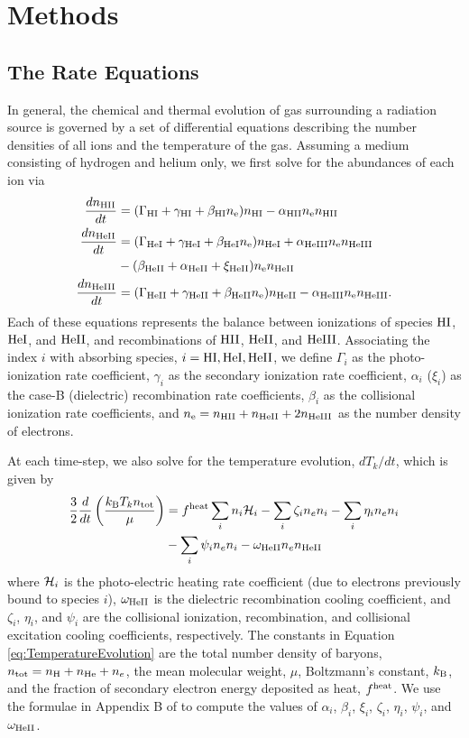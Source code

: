 \documentclass[letterpaper,titlepage,12pt]{article}
\numberwithin{equation}{section}
\begin{document}
\section{Methods}
\subsection{The Rate Equations}
In general, the chemical and thermal evolution of gas surrounding a radiation
source is governed by a set of differential equations describing the number
densities of all ions and the temperature of the gas. Assuming a medium
consisting of hydrogen and helium only, we first solve for the abundances of
each ion via
\begin{align}
    \frac{d n_{\text{HII}}}{dt} & = (\Gamma_{\text{HI}} + \gamma_{\text{HI}} + \beta_{\text{HI}} n_{\text{e}}) n_{\text{HI}} - \alpha_{\text{HII}} n_{\text{e}} n_{\text{HII}}   \label{eq:HIIRateEquation} \\ 
    \frac{d n_{\text{HeII}}}{dt} & = (\Gamma_{\text{HeI}} + \gamma_{\text{HeI}} + \beta_{\text{HeI}} n_{\text{e}}) n_{\text{HeI}} \nonumber + \alpha_{\text{HeIII}} n_{\text{e}} n_{\text{HeIII}} \\  & - (\beta_{\text{HeII}} + \alpha_{\text{HeII}} + \xi_{\text{HeII}}) n_{\text{e}} n_{\text{HeII}} \label{eq:HeIIRateEquation} \\ 
    \frac{d n_{\text{HeIII}}}{dt} & = (\Gamma_{\text{HeII}} + \gamma_{\text{HeII}} + \beta_{\text{HeII}} n_{\text{e}}) n_{\text{HeII}}  - \alpha_{\text{HeIII}} n_{\text{e}} n_{\text{HeIII}} . \label{eq:HeIIIRateEquation}
\end{align}
Each of these equations represents the balance between ionizations of species
$\text{HI}$, $\text{HeI}$, and $\text{HeII}$, and recombinations of $\text{HII}$, $\text{HeII}$, and
$\text{HeIII}$. Associating the index $i$ with absorbing species, $i = \text{HI}, \text{HeI},
\text{HeII}$, we define $\Gamma_i$ as the photo-ionization rate coefficient,
$\gamma_i$ as the secondary ionization rate coefficient, $\alpha_i$ ($\xi_i$)
as the case-B (dielectric) recombination rate coefficients, $\beta_i$ as the
collisional ionization rate coefficients, and $n_{\text{e}} = n_{\text{HII}} + n_{\text{HeII}} +
2n_{\text{HeIII}}$ as the number density of electrons.

At each time-step, we also solve for the temperature evolution, $dT_k/dt$,
which
is given by
\begin{align}
    \frac{3}{2}\frac{d}{dt}\left(\frac{k_{\text{B}} T_k n_{\text{tot}}}{\mu}\right) & = f^{\text{heat}}  \sum_i n_i \mathcal{H}_i - \sum_i \zeta_i n_e n_i - \sum_i \eta_i n_e n_i \nonumber \\ & - \sum_i \psi_i n_e n_i - \omega_{\text{HeII}} n_e n_{\text{HeII}} \label{eq:TemperatureEvolution} 
\end{align}
where $\mathcal{H}_i$ is the photo-electric heating rate coefficient (due to
electrons previously bound to species $i$), $\omega_{\text{HeII}}$ is the dielectric
recombination cooling coefficient, and $\zeta_i$, $\eta_i$, and $\psi_i$ are
the collisional ionization, recombination, and collisional excitation cooling
coefficients, respectively. The constants in Equation
\ref{eq:TemperatureEvolution} are the total number density of baryons, $n_{\text{tot}}
= n_\mathrm{H} + n_{\mathrm{He}} + n_e$, the mean molecular weight, $\mu$,
Boltzmann's constant, $k_{\text{B}}$, and the fraction of secondary electron energy
deposited as heat, $f^{\text{heat}}$. We use the formulae in Appendix B of
\citet{Fukugita1994} to compute the values of $\alpha_i$, $\beta_i$, $\xi_i$,
$\zeta_i$, $\eta_i$, $\psi_i$, and $\omega_{\text{HeII}}$.
\end{document}
